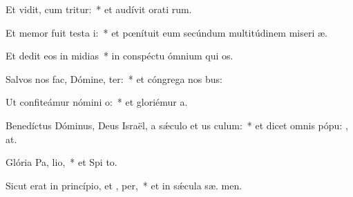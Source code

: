 \item Et vidit, cum tritur:~* et audívit orati rum.
\item Et memor fuit testa i:~* et pœnítuit eum secúndum multitúdinem miseri æ.
\item Et dedit eos in midias~* in conspéctu ómnium qui  os.
\item Salvos nos fac, Dómine,  ter:~* et cóngrega nos  bus:
\item Ut confiteámur nómini  o:~* et gloriémur   a.
\item Benedíctus Dóminus, Deus Israël, a sǽculo et us  culum:~* et dicet omnis pópu: , at.
\item Glória Pa,  lio,~* et Spi to.
\item Sicut erat in princípio, et ,  per,~* et in sǽcula sæ. men.
